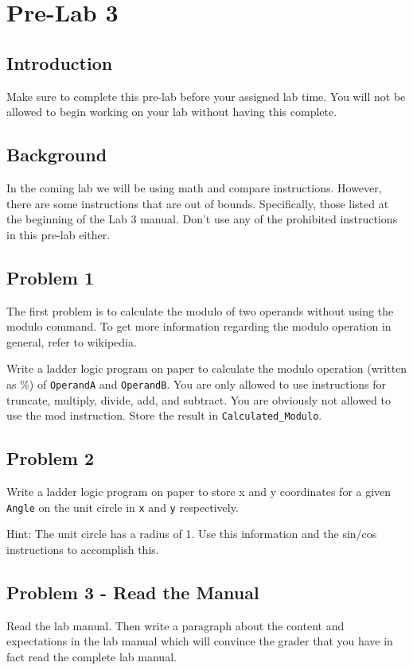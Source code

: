\chapter{Pre-Lab 3}
\setcounter{TASignatures}{0}
\setcounter{AsideCounter}{0}

\section{Introduction}

Make sure to complete this pre-lab before your assigned lab time. You will not be allowed to begin working on your lab without having this complete.

\section{Background}


In the coming lab we will be using math and compare instructions. However, there are some instructions that are out of bounds. Specifically, those listed at the beginning of the Lab 3 manual. Don't use any of the prohibited instructions in this pre-lab either.


\section{Problem 1}

The first problem is to calculate the modulo of two operands without using the modulo command. To get more information regarding the modulo operation in general, refer to wikipedia. 

Write a ladder logic program on paper to calculate the modulo operation (written as \%) of \verb|OperandA| and \verb|OperandB|. You are only allowed to use instructions for truncate, multiply, divide, add, and subtract. You are obviously not allowed to use the mod instruction. Store the result in \verb|Calculated_Modulo|.




\section{Problem 2}

Write a ladder logic program on paper to store x and y coordinates for a given \verb|Angle| on the unit circle in \verb|x| and \verb|y| respectively.

Hint: The unit circle has a radius of 1. Use this information and the sin/cos instructions to accomplish this.


\section{Problem 3 - Read the Manual}

Read the lab manual. Then write a paragraph about the content and expectations in the lab manual which will convince the grader that you have in fact read the complete lab manual.
